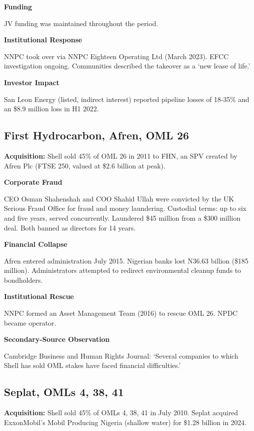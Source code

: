 \documentclass[twoside,fontset=lmodern]{mitthesis}
\begin{document}
\textbf{Funding}

JV funding was maintained throughout the period.

\textbf{Institutional Response}

NNPC took over via NNPC Eighteen Operating Ltd (March 2023). EFCC
investigation ongoing. Communities described the takeover as a `new
lease of life.'

\textbf{Investor Impact}

San Leon Energy (listed, indirect interest) reported pipeline losses of
18-35\% and an \$8.9 million loss in H1 2022.

\hypertarget{first-hydrocarbon-afren-oml-26}{%
\subsection{First Hydrocarbon, Afren, OML
26}\label{first-hydrocarbon-afren-oml-26}}

\textbf{Acquisition:} Shell sold 45\% of OML 26 in 2011 to FHN, an SPV
created by Afren Plc (FTSE 250, valued at \$2.6 billion at peak).

\textbf{Corporate Fraud}

CEO Osman Shahenshah and COO Shahid Ullah were convicted by the UK
Serious Fraud Office for fraud and money laundering. Custodial terms: up
to six and five years, served concurrently. Laundered \$45 million from
a \$300 million deal. Both banned as directors for 14 years.

\textbf{Financial Collapse}

Afren entered administration July 2015. Nigerian banks lost N36.63
billion (\$185 million). Administrators attempted to redirect
environmental cleanup funds to bondholders.

\textbf{Institutional Rescue}

NNPC formed an Asset Management Team (2016) to rescue OML 26. NPDC
became operator.

\textbf{Secondary-Source Observation}

Cambridge Business and Human Rights Journal: `Several companies to which
Shell has sold OML stakes have faced financial difficulties.'

\hypertarget{seplat-omls-4-38-41}{%
\subsection{Seplat, OMLs 4, 38, 41}\label{seplat-omls-4-38-41}}

\textbf{Acquisition:} Shell sold 45\% of OMLs 4, 38, 41 in July 2010.
Seplat acquired ExxonMobil's Mobil Producing Nigeria (shallow water) for
\$1.28 billion in 2024.
\end{document}
